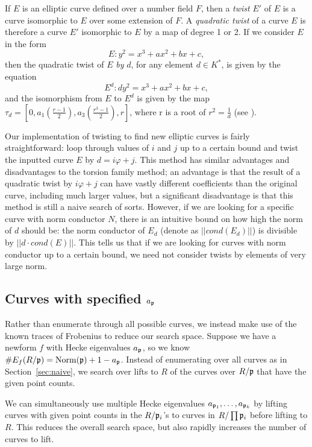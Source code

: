 \documentclass{amsart}
\begin{document}
If $E$ is an elliptic curve defined over a number field $F$, then a \emph{twist} $E'$ of $E$ is a curve isomorphic to $E$ over some extension of $F$. A \emph{quadratic twist} of a curve $E$ is therefore a curve $E'$ isomorphic to $E$ by a map of degree 1 or 2. If we consider $E$ in the form
\begin{equation}
E:   y^2 = x^3 + ax^2 + bx + c, \nonumber
\end{equation}
then the quadratic twist of $E$ \emph{by} $d$, for any element $d \in K^*$, is given by the equation
\begin{equation}
E^d:   dy^2 = x^3 + ax^2 + bx + c, \nonumber
\end{equation}
and the isomorphism from $E$ to $E^d$ is given by the map $\tau_d = [0, a_1(\frac{r-1}{2}), a_3(\frac{r^3-1}{2}), r]$, where r is a root of $r^2 = \frac{1}{d}$ (see \cite{connell:handbook}).

Our implementation of twisting to find new elliptic curves is fairly straightforward: loop through values of $i$ and $j$ up to a certain bound and twist the inputted curve $E$ by $d = i\varphi+j$. This method has similar advantages and disadvantages to the torsion family method; an advantage is that the result of a quadratic twist by $i\varphi+j$ can have vastly different coefficients than the original curve, including much larger values, but a significant disadvantage is that this method is still a naive search of sorts. However, if we are looking for a specific curve with norm conductor $N$, there is an intuitive bound on how high the norm of $d$ should be: the norm conductor of $E_d$ (denote as $||cond(E_d)||$) is divisible by $||d\cdot cond(E)||$. This tells us that if we are looking for curves with norm conductor up to a certain bound, we need not consider twists by elements of very large norm.

\subsection{Curves with specified $a_{\mathfrak{p}}$}

Rather than enumerate through all possible curves, we instead make use
of the known traces of Frobenius to reduce our search space. Suppose
we have a newform $f$ with Hecke eigenvalues $a_{\mathfrak{p}}$, so we know
$\#E_f(R/\mathfrak{p})=\operatorname{Norm}(\mathfrak{p})+1-a_{\mathfrak{p}}$. Instead of enumerating over all
curves as in Section~\ref{sec:naive}, we search over lifts to $R$ of the
curves over $R/\mathfrak{p}$ that have the given point counts.

We can simultaneously use multiple Hecke eigenvalues
$a_{\mathfrak{p}_1},\ldots,a_{\mathfrak{p}_k}$ by lifting curves with given point counts
in the $R/\mathfrak{p}_i$'s to curves in $R/\prod \mathfrak{p}_i$ before lifting to
$R$. This reduces the overall search space, but also rapidly increases
the number of curves to lift.
\end{document}
